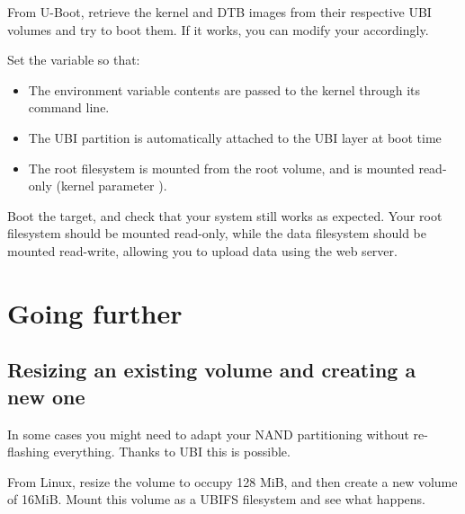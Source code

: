 From U-Boot, retrieve the kernel and DTB images from their respective
UBI volumes and try to boot them. If it works, you can modify your
 accordingly.

Set the  variable so that:

\begin{itemize}
\item The  environment variable contents are passed to
  the kernel through its command line. 
\item The UBI partition is automatically attached to the UBI layer at
  boot time
\item The root filesystem is mounted from the root volume, and is mounted
  read-only (kernel parameter ).
\end{itemize}

Boot the target, and check that your system still works as
expected. Your root filesystem should be mounted read-only, while the
data filesystem should be mounted read-write, allowing you to upload
data using the web server.


\section{Going further}

\subsection{Resizing an existing volume and creating a new one}

In some cases you might need to adapt your NAND partitioning without
re-flashing everything. Thanks to UBI this is possible.

From Linux, resize the  volume to occupy 128 MiB,
and then create a new  volume of 16MiB. Mount this
volume as a UBIFS filesystem and see what happens.

